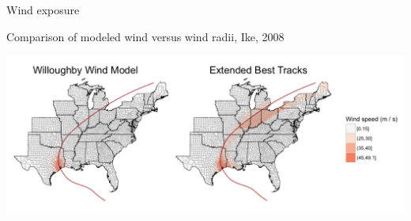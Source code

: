 \documentclass[ignorenonframetext,]{beamer}
\begin{document}
\begin{frame}{Wind exposure}

\begin{center}
Comparison of modeled wind versus wind radii, Ike, 2008
\end{center}

\vspace{-1cm}

\begin{flushleft}\includegraphics[width=1.05\textwidth]{wind_model_eval_ike_2008} \end{flushleft}

\end{frame}
\end{document}
